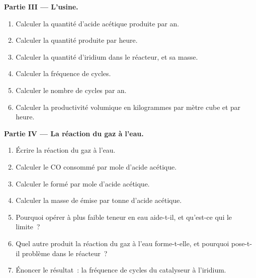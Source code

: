 \begin{problem}
\medskip\noindent\textbf{Partie III --- L'usine.}
\begin{enumerate}[resume]
  \item Calculer la quantité d'acide acétique produite par an.
  \item Calculer la quantité produite par heure.
  \item Calculer la quantité d'iridium dans le réacteur, et sa masse.
  \item Calculer la fréquence de cycles.
  \item Calculer le nombre de cycles par an.
  \item Calculer la productivité volumique en kilogrammes par mètre cube et
        par heure.
\end{enumerate}

\medskip\noindent\textbf{Partie IV --- La réaction du gaz à l'eau.}
\begin{enumerate}[resume]
  \item Écrire la réaction du gaz à l'eau.
  \item Calculer le CO consommé par mole d'acide acétique.
  \item Calculer le  formé par mole d'acide acétique.
  \item Calculer la masse de  émise par tonne d'acide acétique.
  \item Pourquoi opérer à plus faible teneur en eau aide-t-il, et qu'est-ce
        qui le limite~?
  \item Quel autre produit la réaction du gaz à l'eau forme-t-elle, et
        pourquoi pose-t-il problème dans le réacteur~?
  \item Énoncer le résultat~: la fréquence de cycles du catalyseur à
        l'iridium.
\end{enumerate}
\end{problem}

